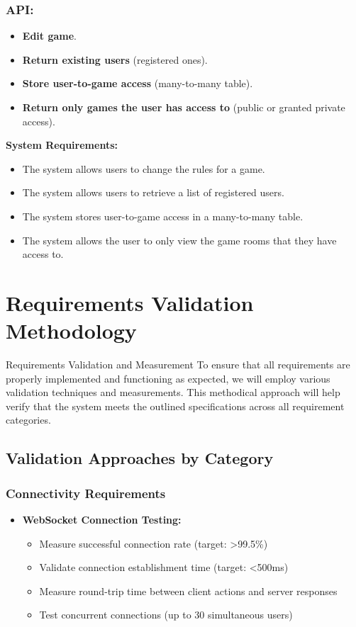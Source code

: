 \documentclass[]{VUMIFTemplateClass}
\begin{document}
\subsubsection{API:}
\begin{itemize}
    \item \textbf{Edit game}.
    \item \textbf{Return existing users} (registered ones).
    \item \textbf{Store user-to-game access} (many-to-many table).
    \item \textbf{Return only games the user has access to} (public or granted private access).
\end{itemize}

\textbf{System Requirements:}
\begin{itemize}
    \item The system allows users to change the rules for a game.
    \item The system allows users to retrieve a list of registered users.
    \item The system stores user-to-game access in a many-to-many table.
    \item The system allows the user to only view the game rooms that they have access to.
\end{itemize}




\section{Requirements Validation Methodology}
Requirements Validation and Measurement
To ensure that all requirements are properly implemented and functioning as expected, we will employ various validation techniques and measurements. This methodical approach will help verify that the system meets the outlined specifications across all requirement categories.

\subsection{Validation Approaches by Category}

\subsubsection{Connectivity Requirements} 
\begin{itemize} \item \textbf{WebSocket Connection Testing:} 
    \begin{itemize} 
        \item Measure successful connection rate (target: >99.5\%) 
        \item Validate connection establishment time (target: <500ms) 
        \item Measure round-trip time between client actions and server responses
        \item Test concurrent connections (up to 30 simultaneous users) 
    \end{itemize}
\end{itemize}
\end{document}
